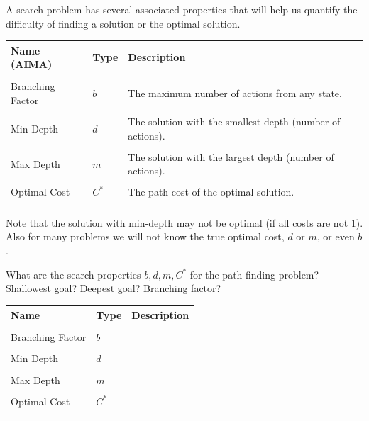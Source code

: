 \documentclass[11pt]{article}
\begin{document}
A search problem has several associated properties that will help us quantify the difficulty of finding a solution or the optimal solution. 

\air
\begin{center}
\begin{tabularx}{\linewidth}{llX}
  \toprule
  Name (AIMA) & Type & Description \\
  \midrule
\\
 Branching Factor & $b$ & The maximum number of actions from any state.  \\\\
 Min Depth &  $d$ & The solution with the smallest depth (number of actions).
 \\\\
 Max Depth & $m$& The solution with the largest depth (number of actions). \\\\
 Optimal Cost & $C^*$& The path cost of the optimal solution. \\\\
 \bottomrule
\end{tabularx}
\end{center}

Note that the solution with min-depth may not be optimal (if all costs
are not 1).  Also for many problems we will not know the true optimal
cost, $d$ or $m$, or even $b$. 



\begin{exercise}
  What are the search properties $b, d, m, C^*$ for the path finding
  problem? Shallowest goal? Deepest goal? Branching factor?
\end{exercise}


\air
\begin{center}
\begin{tabularx}{\linewidth}{llX}
  \toprule
  Name  & Type & Description \\
  \midrule
\\
 Branching Factor & $b$ & \censor{}  \\\\
 Min Depth &  $d$ & \censor{} \\\\
 Max Depth & $m$& \censor{} \\\\
 Optimal Cost & $C^*$& \censor{} \\\\
 \bottomrule
\end{tabularx}
\end{center}
\end{document}
